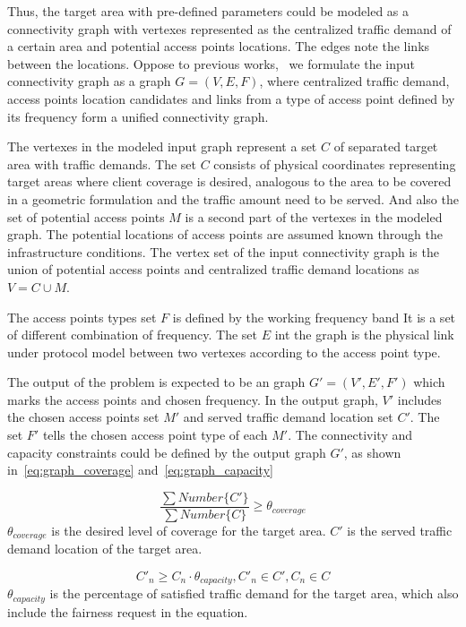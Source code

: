Thus, the target area with pre-defined parameters could be modeled as a connectivity graph with 
vertexes represented as the centralized traffic demand of a certain area and potential access points
locations. The edges note the links between the locations. 
Oppose to previous works,~\cite{robinson2010deploying,franklin2007node,tang2005interference,irwin2013resource}
we formulate the input connectivity graph as a graph $G = (V,E,F)$, where centralized
traffic demand, access points location candidates and links from a type of access point defined by
its frequency form a unified connectivity graph. 

The vertexes in the modeled input graph represent a set $C$ of  separated target area with traffic demands.
The set $C$ consists of physical coordinates representing target areas where client coverage is 
desired, analogous to the area to be covered in a geometric formulation and the traffic amount
need to be served.
And also the set of potential access points $M$ is a second part of the vertexes in the 
modeled graph. The potential locations of access points are assumed known through the 
infrastructure conditions.
The vertex set of the input connectivity graph is the union of potential access points
and centralized traffic demand locations as $V = C\cup M$.

The access points types set $F$ is defined by the working frequency band 
It is a set of different combination of frequency.
The set $E$ int the graph is the physical link under protocol model between two vertexes 
according to the access point type.

The output of the problem is expected to be an graph $G' = (V',E',F')$ which marks the access points
and chosen frequency. 
In the output graph, $V'$ includes the chosen access points set $M'$ and served traffic demand location
set $C'$. The set $F'$ tells the chosen access point type of each $M'$.
The connectivity and capacity constraints could be defined by the output graph $G'$, as shown 
in~\ref{eq:graph_coverage} and~\ref{eq:graph_capacity} 

\begin{equation}
\label{eq:graph_coverage}
\frac{\sum{Number\{C'\}}}{\sum{Number\{C\}}} \ge \theta_{coverage} 
\end{equation}
$\theta_{coverage}$ is the desired level of coverage for the target area. $C'$ is the 
served traffic demand location of the target area. 
 
\begin{equation}
\label{eq:graph_capacity}
C'_n \ge C_n\cdot \theta_{capacity}, C'_n \in C', C_n \in C
\end{equation}
$\theta_{capacity}$ is the percentage of satisfied traffic demand for the target area,
which also include the fairness request in the equation.

